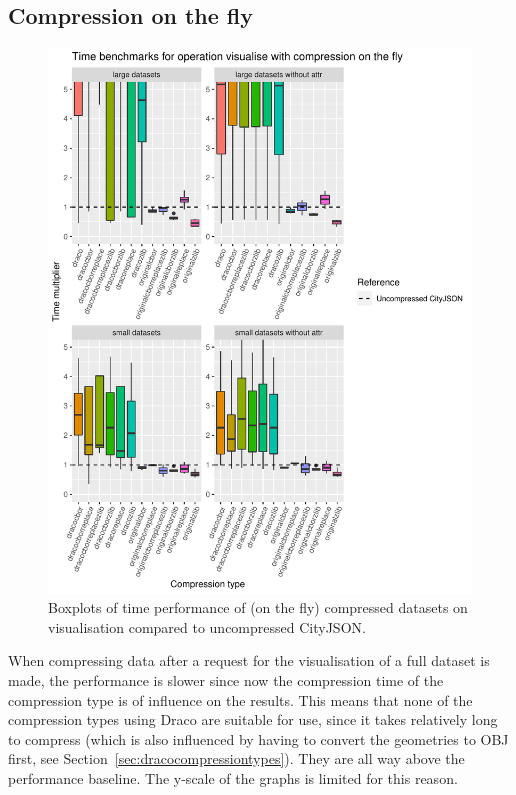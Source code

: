 \clearpage

\subsection{Compression on the fly}

\begin{figure}[h!]
    \includegraphics[scale=0.88]{figs/benchmark/individualotf/visualise.pdf}
    \caption{Boxplots of time performance of (on the fly) compressed datasets on visualisation compared to uncompressed CityJSON.}
    \label{figotf:sdvis}
\end{figure}

When compressing data after a request for the visualisation of a full dataset is made, the performance is slower since now the compression time of the compression type is of influence on the results.
This means that none of the compression types using Draco are suitable for use, since it takes relatively long to compress (which is also influenced by having to convert the geometries to OBJ first, see Section~\ref{sec:dracocompressiontypes}).
They are all way above the performance baseline.
The y-scale of the graphs is limited for this reason.

